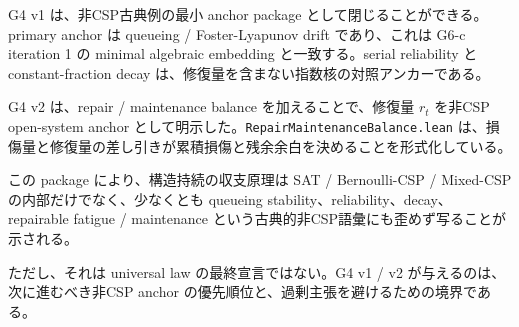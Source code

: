 \documentclass[12pt,a4paper]{article}
\begin{document}
G4 v1 は、非CSP古典例の最小 anchor package として閉じることができる。primary anchor は queueing / Foster-Lyapunov drift であり、これは G6-c iteration 1 の minimal algebraic embedding と一致する。serial reliability と constant-fraction decay は、修復量を含まない指数核の対照アンカーである。

G4 v2 は、repair / maintenance balance を加えることで、修復量 \(r_{t}\) を非CSP open-system anchor として明示した。\texttt{RepairMaintenanceBalance.lean} は、損傷量と修復量の差し引きが累積損傷と残余余白を決めることを形式化している。

この package により、構造持続の収支原理は SAT / Bernoulli-CSP / Mixed-CSP の内部だけでなく、少なくとも queueing stability、reliability、decay、repairable fatigue / maintenance という古典的非CSP語彙にも歪めず写ることが示される。

ただし、それは universal law の最終宣言ではない。G4 v1 / v2 が与えるのは、次に進むべき非CSP anchor の優先順位と、過剰主張を避けるための境界である。
\end{document}
